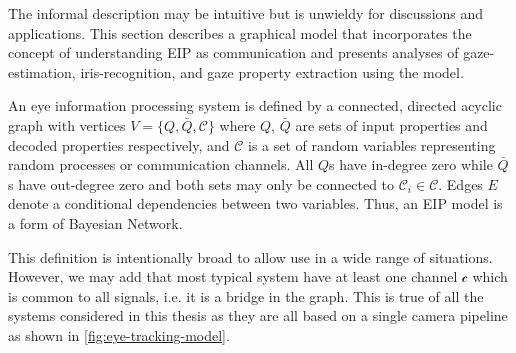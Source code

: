 The informal description may be intuitive but is unwieldy for discussions and applications. This section describes a graphical model that incorporates the concept of understanding EIP as communication and presents analyses of gaze-estimation, iris-recognition, and gaze property extraction using the model.


An eye information processing system is defined by a connected, directed acyclic graph with vertices $V=\{Q, \bar{Q}, \mathcal{C}\}$ where $Q$, $\bar{Q}$ are sets of input properties and decoded properties respectively, and $\mathcal{C}$ is a set of random variables representing random processes or communication channels. All $Q$s have in-degree zero  while $\bar{Q}$s have out-degree zero and both sets may only be connected to $\mathcal{C}_i \in \mathcal{C}$. Edges $E$ denote a conditional dependencies between two variables. Thus, an EIP model is a form of Bayesian Network.

This definition is intentionally broad to allow use in a wide range of situations. However, we may add that most typical system have at least one channel $\mathcal{c}$ which is common to all signals, i.e. it is a bridge in the graph. This is true of all the systems considered in this thesis as they are all based on a single camera pipeline as shown in \cref{fig:eye-tracking-model}.





